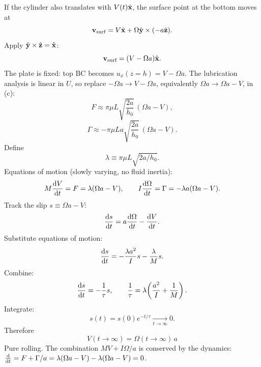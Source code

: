 \documentclass[11pt]{article}
\begin{document}
If the cylinder also translates with $V(t)\hat{\vb x}$, the surface point at the bottom moves at
\[
\vb v_{\text{surf}}=V\hat{\vb x}+\Omega\hat{\vb y}\times(-a\hat{\vb z}).
\]
Apply $\hat{\vb y}\times\hat{\vb z}=\hat{\vb x}$:
\[
\vb v_{\text{surf}}=(V-\Omega a)\hat{\vb x}.
\]
The plate is fixed: top BC becomes $u_x(z=h)=V-\Omega a$. The lubrication analysis is linear in $U$, so replace $-\Omega a\to V-\Omega a$, equivalently $\Omega a\to \Omega a-V$, in (c):
\[
F\approx \pi\mu L\sqrt{\frac{2a}{h_0}}\,(\Omega a-V),
\]
\[
\Gamma\approx -\pi\mu L a\sqrt{\frac{2a}{h_0}}\,(\Omega a-V).
\]
Define
\[
\lambda\equiv \pi\mu L\sqrt{2a/h_0}.
\]
Equations of motion (slowly varying, no fluid inertia):
\[
M\dv{V}{t}=F=\lambda(\Omega a-V),\qquad I\dv{\Omega}{t}=\Gamma=-\lambda a(\Omega a-V).
\]
Track the slip $s\equiv\Omega a-V$:
\[
\dv{s}{t}=a\dv{\Omega}{t}-\dv{V}{t}.
\]
Substitute equations of motion:
\[
\dv{s}{t}=-\frac{\lambda a^2}{I}s-\frac{\lambda}{M}s.
\]
Combine:
\[
\dv{s}{t}=-\frac{1}{\tau}s,\qquad \frac{1}{\tau}=\lambda\!\left(\frac{a^2}{I}+\frac{1}{M}\right).
\]
Integrate:
\[
s(t)=s(0)e^{-t/\tau}\xrightarrow[t\to\infty]{}0.
\]
Therefore
\[
\boxed{\;V(t\to\infty)=\Omega(t\to\infty)\,a\;}
\]
Pure rolling. The combination $MV+I\Omega/a$ is conserved by the dynamics: $\dv{}{t}(MV+I\Omega/a)=F+\Gamma/a=\lambda(\Omega a-V)-\lambda(\Omega a-V)=0$.
\end{document}
